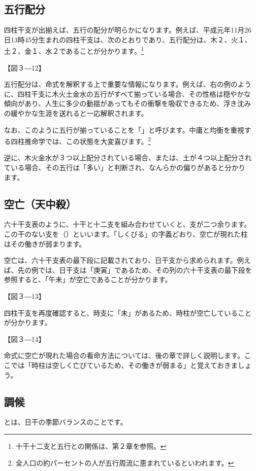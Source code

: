 \documentclass[a5paper,11pt,dvipdfmx]{tarticle}
\begin{document}
\subsection{五行配分}
四柱干支が出揃えば、五行の配分が明らかになります。例えば、平成元年11月26日13時45分生まれの四柱干支は、次のとおりであり、五行配分は、木２、火１、土２、金１、水２であることが分かります。\footnote{十干十二支と五行との関係は、第２章を参照。}

【図３―12】

五行配分は、命式を解釈する上で重要な情報になります。例えば、右の例のように、四柱干支に木火土金水の五行がすべて揃っている場合、その性格は穏やかな傾向があり、人生に多少の動揺があってもその衝撃を吸収できるため、浮き沈みの緩やかな生涯を送れると一応解釈されます。

なお、このように五行が揃っていることを「」と呼びます。中庸と均衡を重視する四柱推命学では、この状態を大変喜びます。\footnote{全人口の約パーセントの人が五行周流に恵まれているといわれます。}

逆に、木火金水が３つ以上配分されている場合、または、土が４つ以上配分されている場合、その五行は「多い」と判断され、なんらかの偏りがあると分かります。

\subsection{空亡（天中殺）}
六十干支表のように、十干と十二支を組み合わせていくと、支が二つ余ります。この干のない支を（）といいます。「しくびる」の字義どおり、空亡が現れた柱はその働きが弱まります。

空亡は、六十干支表の最下段に記載されており、日干支から求められます。例えば、先の例では、日干支は「庚寅」であるため、その列の六十干支表の最下段を参照すると、「午未」が空亡であることが分かります。

【図３―13】

四柱干支を再度確認すると、時支に「未」があるため、時柱が空亡していることが分かります。

【図３―14】

命式に空亡が現れた場合の看命方法については、後の章で詳しく説明します。ここでは「時柱は空しく亡びているため、その働きが弱まる」と覚えておきましょう。

\subsection{調候}
とは、日干の季節バランスのことです。
\end{document}
